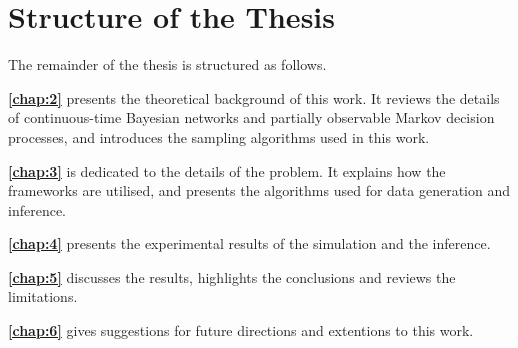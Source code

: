 \section{Structure of the Thesis}
The remainder of the thesis is structured as follows.

\textbf{\cref{chap:2}} presents the theoretical background of this work. It reviews the details of continuous-time Bayesian networks and partially observable Markov decision processes, and introduces the sampling algorithms used in this work.

\textbf{\cref{chap:3}} is dedicated to the details of the problem. It explains how the frameworks are utilised, and presents the algorithms used for data generation and inference.

\textbf{\cref{chap:4}} presents the experimental results of the simulation and the inference.

\textbf{\cref{chap:5}} discusses the results, highlights the conclusions and reviews the limitations.

\textbf{\cref{chap:6}} gives suggestions for future directions and extentions to this work.